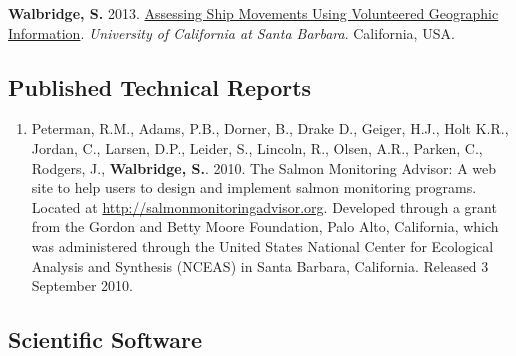 \documentclass[letterpaper]{article}
\renewenvironment{itemize}{
  \begin{list}{}{
    \setlength{\leftmargin}{1.5em}
  }
}{
  \end{list}
}
\begin{document}
\begin{itemize}
\item {\bf Walbridge, S.} 2013. \href{https://4326.us/thesis/walbridge-masters-thesis.pdf}{Assessing Ship Movements Using Volunteered Geographic Information}. {\it University of California at Santa Barbara}. California, USA.
\end{itemize}



\subsection*{Published Technical Reports}

\begin{enumerate}
\item Peterman, R.M., Adams, P.B., Dorner, B., Drake D., Geiger, H.J., Holt K.R., Jordan, C., Larsen, D.P., Leider, S., Lincoln, R., Olsen, A.R., Parken, C., Rodgers, J., {\bf Walbridge, S.}. 2010. The Salmon Monitoring Advisor: A web site to help users to design and implement salmon monitoring programs. Located at \href{http://www.salmonmonitoringadvisor.org}{http://salmonmonitoringadvisor.org}. Developed through a grant from the Gordon and Betty Moore Foundation, Palo Alto, California, which was administered through the United States National Center for Ecological Analysis and Synthesis (NCEAS) in Santa Barbara, California. Released 3 September 2010.
\end{enumerate}

\subsection*{Scientific Software}
\end{document}

